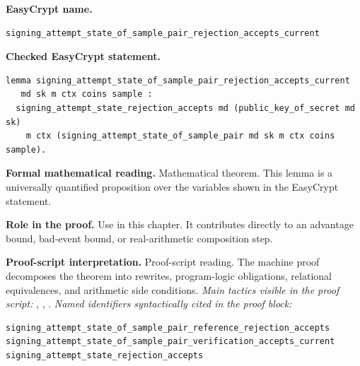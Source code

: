\begin{formaltheorem}
\noindent\textbf{EasyCrypt name.}
\begin{lstlisting}[language=EasyCrypt,basicstyle=\ttfamily\scriptsize]
signing_attempt_state_of_sample_pair_rejection_accepts_current
\end{lstlisting}
\noindent\textbf{Checked EasyCrypt statement.}
\begin{lstlisting}[language=EasyCrypt,basicstyle=\ttfamily\scriptsize]
lemma signing_attempt_state_of_sample_pair_rejection_accepts_current
   md sk m ctx coins sample :
  signing_attempt_state_rejection_accepts md (public_key_of_secret md sk)
    m ctx (signing_attempt_state_of_sample_pair md sk m ctx coins sample).
\end{lstlisting}
\noindent\textbf{Formal mathematical reading.}
Mathematical theorem. This lemma is a universally quantified proposition over the variables shown in the EasyCrypt statement.

\noindent\textbf{Role in the proof.}
Use in this chapter. It contributes directly to an advantage bound, bad-event bound, or real-arithmetic composition step.

\noindent\textbf{Proof-script interpretation.}
Proof-script reading. The machine proof decomposes the theorem into rewrites, program-logic obligations, relational equivalences, and arithmetic side conditions.
\emph{Main tactics visible in the proof script:} , , .
\emph{Named identifiers syntactically cited in the proof block:}
\begin{lstlisting}[language=EasyCrypt,basicstyle=\ttfamily\scriptsize]
signing_attempt_state_of_sample_pair_reference_rejection_accepts
signing_attempt_state_of_sample_pair_verification_accepts_current
signing_attempt_state_rejection_accepts
\end{lstlisting}

\end{formaltheorem}

